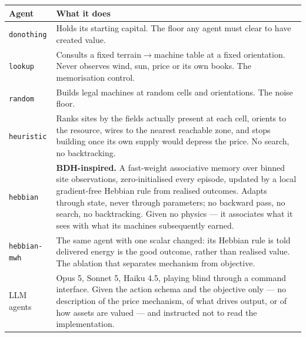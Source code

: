 \documentclass{article}
\begin{document}
\begin{center}
\small
\begin{tabular}{lp{9.4cm}}
\toprule
Agent & What it does \\
\midrule
\texttt{donothing} & Holds its starting capital. The floor any agent must clear
to have created value. \\
\texttt{lookup} & Consults a fixed terrain$\rightarrow$machine table at a fixed
orientation. Never observes wind, sun, price or its own books. The
memorisation control. \\
\texttt{random} & Builds legal machines at random cells and orientations. The
noise floor. \\
\texttt{heuristic} & Ranks sites by the fields actually present at each cell,
orients to the resource, wires to the nearest reachable zone, and stops building
once its own supply would depress the price. No search, no backtracking. \\
\texttt{hebbian} & \textbf{BDH-inspired.} A fast-weight associative memory over
binned site observations, zero-initialised every episode, updated by a local
gradient-free Hebbian rule from realised outcomes. Adapts through state, never
through parameters; no backward pass, no search, no backtracking. Given no
physics --- it associates what it sees with what its machines subsequently
earned. \\
\texttt{hebbian-mwh} & The same agent with one scalar changed: its Hebbian rule
is told delivered energy is the good outcome, rather than realised value. The
ablation that separates mechanism from objective. \\
\midrule
LLM agents & Opus 5, Sonnet 5, Haiku 4.5, playing blind through a command
interface. Given the action schema and the objective only --- no description of
the price mechanism, of what drives output, or of how assets are valued --- and
instructed not to read the implementation. \\
\bottomrule
\end{tabular}
\end{center}

\end{document}
